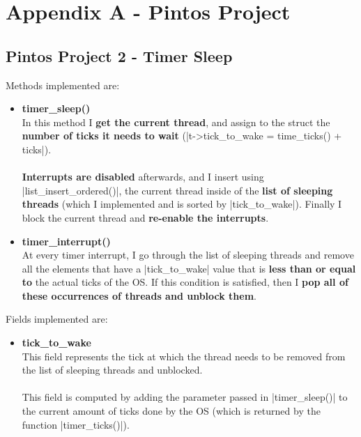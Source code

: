 \documentclass{article}
\begin{document}
\newpage



\section{Appendix A - Pintos Project}
\subsection{Pintos Project 2 - Timer Sleep}
Methods implemented are:

\begin{itemize}
	\item \textbf{timer\_sleep()}
	\vspace{.2cm} \\
	In this method I \textbf{get the current thread}, and assign to the struct the \textbf{number of ticks it needs to wait} (\cverb|t->tick_to_wake = time_ticks() + ticks|). \\ \\
	\textbf{Interrupts are disabled} afterwards, and I insert using \cverb|list_insert_ordered()|, the current thread inside of the \textbf{list of sleeping threads} (which I implemented and is sorted by \cverb|tick_to_wake|). Finally I block the current thread and \textbf{re-enable the interrupts}.
	
	\item \textbf{timer\_interrupt()}
	\vspace{.2cm} \\
	At every timer interrupt, I go through the list of sleeping threads and remove all the elements that have a \cverb|tick_to_wake| value that is \textbf{less than or equal to} the actual ticks of the OS. If this condition is satisfied, then I \textbf{pop all of these occurrences of threads and unblock them}.
\end{itemize}
Fields implemented are:

\begin{itemize}
	\item \textbf{tick\_to\_wake}
	\vspace{.2cm} \\
	This field represents the tick at which the thread needs to be removed from the list of sleeping threads and unblocked. \\ \\
	This field is computed by adding the parameter passed in \cverb|timer_sleep()| to the current amount of ticks done by the OS (which is returned by the function \cverb|timer_ticks()|).
\end{itemize}
\end{document}
